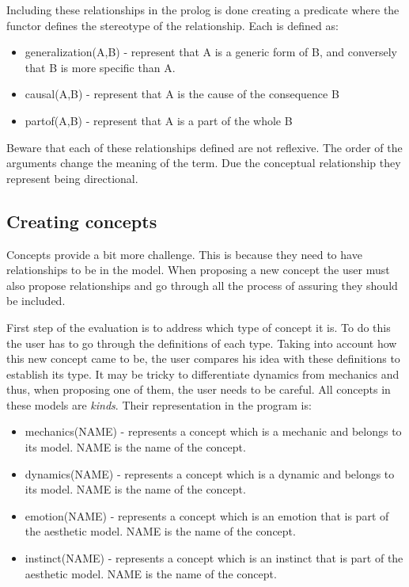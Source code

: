Including these relationships in the prolog is done creating a predicate where the functor defines the stereotype of the relationship. Each is defined as:
\begin{itemize}
    \item generalization(A,B) - represent that A is a generic form of B, and conversely that B is more specific than A. 
    \item causal(A,B) - represent that A is the cause of the consequence B
    \item partof(A,B) - represent that A is a part of the whole B
\end{itemize}

Beware that each of these relationships defined are not reflexive. The order of the arguments change the meaning of the term. Due the conceptual relationship they represent being directional.

\subsection{Creating concepts}

Concepts provide a bit more challenge. This is because they need to have relationships to be in the model. When proposing a new concept the user must also propose relationships and go through all the process of assuring they should be included.

First step of the evaluation is to address which type of concept it is. To do this the user has to go through the definitions of each type. Taking into account how this new concept came to be, the user compares his idea with these definitions to establish its type. It may be tricky to differentiate dynamics from mechanics and thus, when proposing one of them, the user needs to be careful. All concepts in these models are \textit{kinds}. Their representation in the program is:
\begin{itemize}
    \item mechanics(NAME) - represents a concept which is a mechanic and belongs to its model. NAME is the name of the concept.
    \item dynamics(NAME) - represents a concept which is a dynamic and belongs to its model. NAME is the name of the concept.
    \item emotion(NAME) - represents a concept which is an emotion that is part of the aesthetic model. NAME is the name of the concept.
    \item instinct(NAME) - represents a concept which is an instinct that is part of the aesthetic model. NAME is the name of the concept.
\end{itemize}

